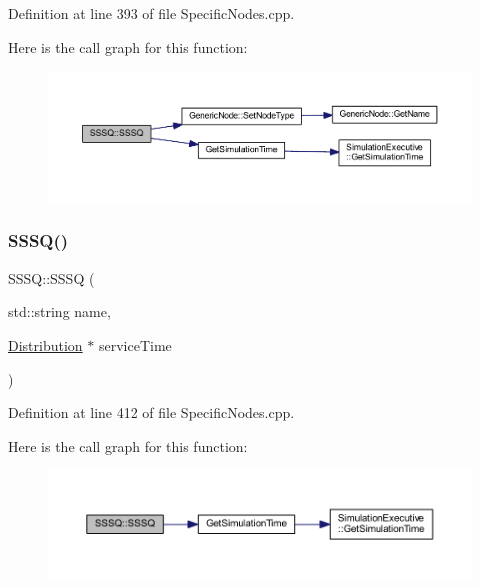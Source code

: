 Definition at line 393 of file Specific\+Nodes.\+cpp.

Here is the call graph for this function\+:
\nopagebreak
\begin{figure}[H]
\begin{center}
\leavevmode
\includegraphics[width=350pt]{class_s_s_s_q_a03276f98400682df04d5a770f6615733_cgraph}
\end{center}
\end{figure}
\mbox{\label{class_s_s_s_q_ab654407f52271f87971b0642dd61a543}} 
\subsubsection{\texorpdfstring{S\+S\+S\+Q()}{SSSQ()}\hspace{0.1cm}{\footnotesize\ttfamily [2/2]}}
{\footnotesize\ttfamily S\+S\+S\+Q\+::\+S\+S\+SQ (\begin{DoxyParamCaption}\item[{std\+::string}]{name,  }\item[{\hyperlink{class_distribution}{Distribution} $\ast$}]{service\+Time }\end{DoxyParamCaption})}



Definition at line 412 of file Specific\+Nodes.\+cpp.

Here is the call graph for this function\+:
\nopagebreak
\begin{figure}[H]
\begin{center}
\leavevmode
\includegraphics[width=350pt]{class_s_s_s_q_ab654407f52271f87971b0642dd61a543_cgraph}
\end{center}
\end{figure}
\mbox{\label{class_s_s_s_q_a6316b4f5b481609f244022cd83ef67bb}} 
